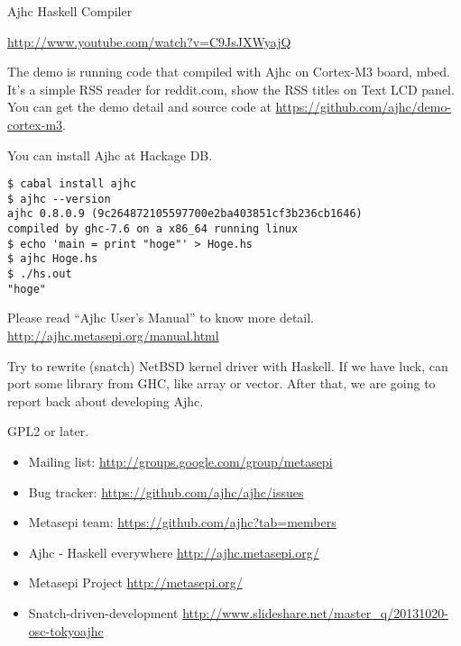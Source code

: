\documentclass[DIV16,twocolumn,10pt]{scrreprt}
\begin{document}
\begin{hcarentry}{Ajhc Haskell Compiler}
\vspace*{10pt}

\noindent \url{http://www.youtube.com/watch?v=C9JsJXWyajQ}

The demo is running code that compiled with Ajhc on Cortex-M3 board, mbed. It's a simple RSS reader for reddit.com, show the RSS titles on Text LCD panel. You can get the demo detail and source code at \url{https://github.com/ajhc/demo-cortex-m3}.

\Usage

You can install Ajhc at Hackage DB.

\begin{verbatim}
$ cabal install ajhc
$ ajhc --version
ajhc 0.8.0.9 (9c264872105597700e2ba403851cf3b236cb1646)
compiled by ghc-7.6 on a x86_64 running linux
$ echo 'main = print "hoge"' > Hoge.hs
$ ajhc Hoge.hs
$ ./hs.out
"hoge"
\end{verbatim}

Please read ``Ajhc User's Manual'' to know more detail. \url{http://ajhc.metasepi.org/manual.html}

\FuturePlans

Try to rewrite (snatch) NetBSD kernel driver with Haskell. If we have luck, can port some library from GHC, like array or vector. After that, we are going to report back about developing Ajhc.

\License

GPL2 or later.

\Contact
  \begin{itemize}
    \item Mailing list: \url{http://groups.google.com/group/metasepi}
    \item Bug tracker: \url{https://github.com/ajhc/ajhc/issues}
    \item Metasepi team: \url{https://github.com/ajhc?tab=members}
  \end{itemize}

\FurtherReading
  \begin{itemize}
    \item Ajhc - Haskell everywhere \url{http://ajhc.metasepi.org/}
    \item Metasepi Project \url{http://metasepi.org/}
    \item Snatch-driven-development \url{http://www.slideshare.net/master\_q/20131020-osc-tokyoajhc}
  \end{itemize}
\end{hcarentry}
\end{document}
